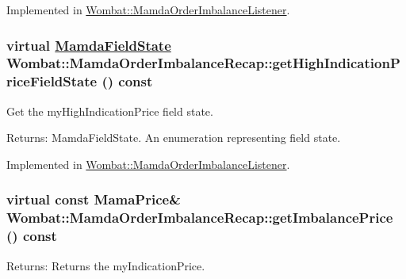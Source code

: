 Implemented in \hyperlink{classWombat_1_1MamdaOrderImbalanceListener_596c5c1e351924b74e0f81af784a45a1}{Wombat::Mamda\-Order\-Imbalance\-Listener}.\hypertarget{classWombat_1_1MamdaOrderImbalanceRecap_7515d1c6c386cc1e68039922968fdb9d}{
\subsubsection[getHighIndicationPriceFieldState]{\setlength{\rightskip}{0pt plus 5cm}virtual \hyperlink{namespaceWombat_93aac974f2ab713554fd12a1fa3b7d2a}{Mamda\-Field\-State} Wombat::Mamda\-Order\-Imbalance\-Recap::get\-High\-Indication\-Price\-Field\-State () const}}
\label{classWombat_1_1MamdaOrderImbalanceRecap_7515d1c6c386cc1e68039922968fdb9d}


Get the my\-High\-Indication\-Price field state. 

\begin{Desc}
\item[Returns:]Mamda\-Field\-State. An enumeration representing field state. \end{Desc}


Implemented in \hyperlink{classWombat_1_1MamdaOrderImbalanceListener_6272673c1cf08580d09ec73d0e458734}{Wombat::Mamda\-Order\-Imbalance\-Listener}.\hypertarget{classWombat_1_1MamdaOrderImbalanceRecap_2de9b81042cfa08034717b7930d436f0}{
\subsubsection[getImbalancePrice]{\setlength{\rightskip}{0pt plus 5cm}virtual const Mama\-Price\& Wombat::Mamda\-Order\-Imbalance\-Recap::get\-Imbalance\-Price () const}}
\label{classWombat_1_1MamdaOrderImbalanceRecap_2de9b81042cfa08034717b7930d436f0}


\begin{Desc}
\item[Returns:]Returns the my\-Indication\-Price. \end{Desc}


